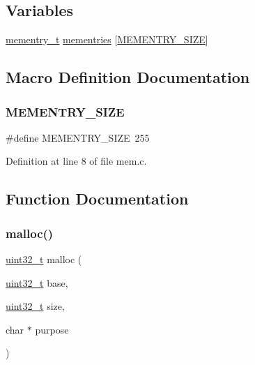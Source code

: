 \subsection*{Variables}
\begin{DoxyCompactItemize}
\item 
\hyperlink{a00110_a876b6ee19692762a87e4673911f9b8da_a876b6ee19692762a87e4673911f9b8da}{mementry\+\_\+t} \hyperlink{a00107_a9ec3d7a60bca9bd965aba15905c6d1ed_a9ec3d7a60bca9bd965aba15905c6d1ed}{mementries} \mbox{[}\hyperlink{a00107_a48623ea6ed429e2f046b49041dde1dc5_a48623ea6ed429e2f046b49041dde1dc5}{M\+E\+M\+E\+N\+T\+R\+Y\+\_\+\+S\+I\+ZE}\mbox{]}
\end{DoxyCompactItemize}


\subsection{Macro Definition Documentation}
\mbox{\label{a00107_a48623ea6ed429e2f046b49041dde1dc5_a48623ea6ed429e2f046b49041dde1dc5}} 
\subsubsection{\texorpdfstring{M\+E\+M\+E\+N\+T\+R\+Y\+\_\+\+S\+I\+ZE}{MEMENTRY\_SIZE}}
{\footnotesize\ttfamily \#define M\+E\+M\+E\+N\+T\+R\+Y\+\_\+\+S\+I\+ZE~255}



Definition at line 8 of file mem.\+c.



\subsection{Function Documentation}
\mbox{\label{a00107_a9087e3504e5973deee6f3561705978c7_a9087e3504e5973deee6f3561705978c7}} 
\subsubsection{\texorpdfstring{malloc()}{malloc()}}
{\footnotesize\ttfamily \hyperlink{a00095_a435d1572bf3f880d55459d9805097f62_a435d1572bf3f880d55459d9805097f62}{uint32\+\_\+t} malloc (\begin{DoxyParamCaption}\item[{\hyperlink{a00095_a435d1572bf3f880d55459d9805097f62_a435d1572bf3f880d55459d9805097f62}{uint32\+\_\+t}}]{base,  }\item[{\hyperlink{a00095_a435d1572bf3f880d55459d9805097f62_a435d1572bf3f880d55459d9805097f62}{uint32\+\_\+t}}]{size,  }\item[{char $\ast$}]{purpose }\end{DoxyParamCaption})}



